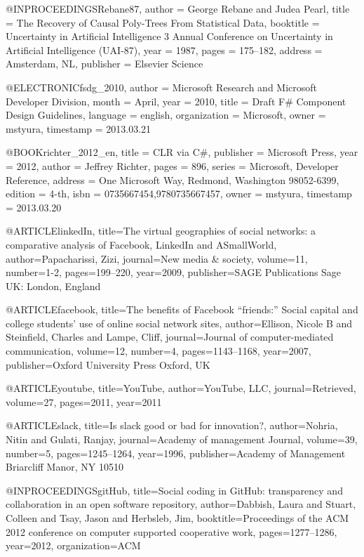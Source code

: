 @INPROCEEDINGS{Rebane87,
  author = {George Rebane and Judea Pearl},
  title = {The Recovery of Causal Poly-Trees From Statistical Data},
  booktitle = {Uncertainty in Artificial Intelligence 3 Annual Conference on Uncertainty
	in Artificial Intelligence (UAI-87)},
  year = {1987},
  pages = {175--182},
  address = {Amsterdam, NL},
  publisher = {Elsevier Science}
}

@ELECTRONIC{fsdg_2010,
  author = {Microsoft Research and Microsoft Developer Division},
  month = {April},
  year = {2010},
  title = {Draft F\# Component Design Guidelines},
  language = {english},
  organization = {Microsoft},
  owner = {mstyura},
  timestamp = {2013.03.21}
}

@BOOK{richter_2012_en,
  title = {CLR via C\#},
  publisher = {Microsoft Press},
  year = {2012},
  author = {Jeffrey Richter},
  pages = {896},
  series = {Microsoft, Developer Reference},
  address = {One Microsoft Way, Redmond, Washington 98052-6399},
  edition = {4-th},
  isbn = {0735667454,9780735667457},
  owner = {mstyura},
  timestamp = {2013.03.20}
}

@ARTICLE{linkedIn,
  title={The virtual geographies of social networks: a comparative analysis of Facebook, LinkedIn and ASmallWorld},
  author={Papacharissi, Zizi},
  journal={New media \& society},
  volume={11},
  number={1-2},
  pages={199--220},
  year={2009},
  publisher={SAGE Publications Sage UK: London, England}
}

@ARTICLE{facebook,
  title={The benefits of Facebook “friends:” Social capital and college students’ use of online social network sites},
  author={Ellison, Nicole B and Steinfield, Charles and Lampe, Cliff},
  journal={Journal of computer-mediated communication},
  volume={12},
  number={4},
  pages={1143--1168},
  year={2007},
  publisher={Oxford University Press Oxford, UK}
}

@ARTICLE{youtube,
  title={YouTube},
  author={YouTube, LLC},
  journal={Retrieved},
  volume={27},
  pages={2011},
  year={2011}
}

@ARTICLE{slack,
  title={Is slack good or bad for innovation?},
  author={Nohria, Nitin and Gulati, Ranjay},
  journal={Academy of management Journal},
  volume={39},
  number={5},
  pages={1245--1264},
  year={1996},
  publisher={Academy of Management Briarcliff Manor, NY 10510}
}

@INPROCEEDINGS{gitHub,
  title={Social coding in GitHub: transparency and collaboration in an open software repository},
  author={Dabbish, Laura and Stuart, Colleen and Tsay, Jason and Herbsleb, Jim},
  booktitle={Proceedings of the ACM 2012 conference on computer supported cooperative work},
  pages={1277--1286},
  year={2012},
  organization={ACM}
}

